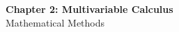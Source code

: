 \documentclass[12pt]{article}
\begin{document}
\begin{center}
  {\LARGE\bfseries Chapter 2: Multivariable Calculus}\\[0.25em]
  {\large Mathematical Methods}\\[0.15em]
\end{center}

\end{document}
